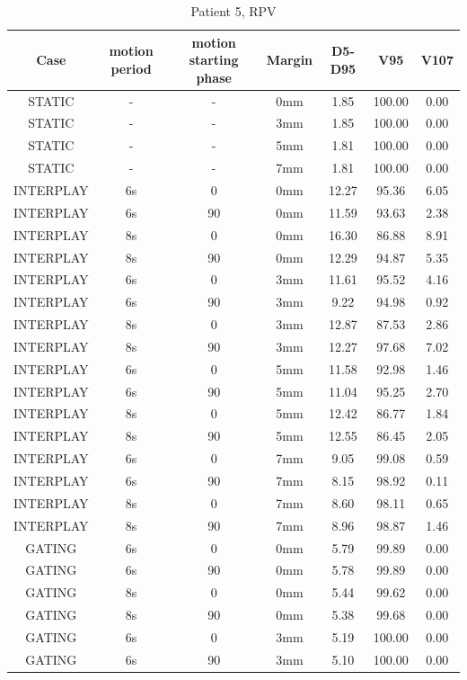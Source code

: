 \documentclass[type=dr, dr=rernat, accentcolor=tud7b,colorbacktitle, bigchapter, openright, twoside, 12pt ]{tudthesis}
\begin{document}
\begin{table}[H]
  \centering
  \caption{Patient 5, RPV}
  \begin{tabular}{|c||c|c|c||c|c|c|}
    \hline\hline
    Case & motion period & motion starting phase & Margin & D5-D95 & V95 & V107\\
    \hline 
STATIC & - & - & 0mm & 1.85 & 100.00 & 0.00 \\
STATIC & - & - & 3mm & 1.85 & 100.00 & 0.00 \\
STATIC & - & - & 5mm & 1.81 & 100.00 & 0.00 \\
STATIC & - & - & 7mm & 1.81 & 100.00 & 0.00 \\
INTERPLAY & 6s & 0 & 0mm & 12.27 & 95.36 & 6.05 \\
INTERPLAY & 6s & 90 & 0mm & 11.59 & 93.63 & 2.38 \\
INTERPLAY & 8s & 0 & 0mm & 16.30 & 86.88 & 8.91 \\
INTERPLAY & 8s & 90 & 0mm & 12.29 & 94.87 & 5.35 \\
INTERPLAY & 6s & 0 & 3mm & 11.61 & 95.52 & 4.16 \\
INTERPLAY & 6s & 90 & 3mm & 9.22 & 94.98 & 0.92 \\
INTERPLAY & 8s & 0 & 3mm & 12.87 & 87.53 & 2.86 \\
INTERPLAY & 8s & 90 & 3mm & 12.27 & 97.68 & 7.02 \\
INTERPLAY & 6s & 0 & 5mm & 11.58 & 92.98 & 1.46 \\
INTERPLAY & 6s & 90 & 5mm & 11.04 & 95.25 & 2.70 \\
INTERPLAY & 8s & 0 & 5mm & 12.42 & 86.77 & 1.84 \\
INTERPLAY & 8s & 90 & 5mm & 12.55 & 86.45 & 2.05 \\
INTERPLAY & 6s & 0 & 7mm & 9.05 & 99.08 & 0.59 \\
INTERPLAY & 6s & 90 & 7mm & 8.15 & 98.92 & 0.11 \\
INTERPLAY & 8s & 0 & 7mm & 8.60 & 98.11 & 0.65 \\
INTERPLAY & 8s & 90 & 7mm & 8.96 & 98.87 & 1.46 \\
GATING & 6s & 0 & 0mm & 5.79 & 99.89 & 0.00 \\
GATING & 6s & 90 & 0mm & 5.78 & 99.89 & 0.00 \\
GATING & 8s & 0 & 0mm & 5.44 & 99.62 & 0.00 \\
GATING & 8s & 90 & 0mm & 5.38 & 99.68 & 0.00 \\
GATING & 6s & 0 & 3mm & 5.19 & 100.00 & 0.00 \\
GATING & 6s & 90 & 3mm & 5.10 & 100.00 & 0.00 \\

\end{tabular}
\end{table}
\end{document}
